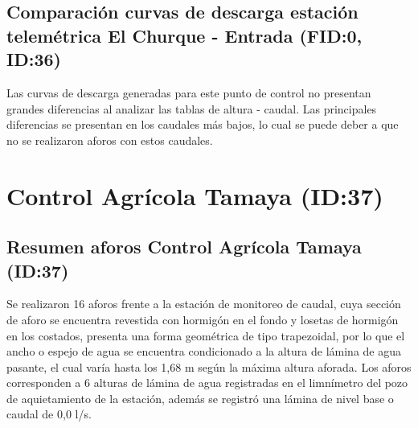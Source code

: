 \documentclass[]{article}
\begin{document}
\subsection{Comparación curvas de descarga estación telemétrica El Churque - Entrada (FID:0, ID:36)}\label{comparación curvas}

Las curvas de descarga generadas para este punto de control no presentan grandes diferencias al analizar las tablas de altura - caudal. Las principales diferencias se presentan en los caudales más bajos, lo cual se puede deber a que no se realizaron aforos con estos caudales.

\clearpage

\section{Control Agrícola Tamaya (ID:37)}\label{ID:37}

\subsection{Resumen aforos Control Agrícola Tamaya (ID:37)}\label{aforos ID:37}

Se realizaron 16 aforos frente a la estación de monitoreo de caudal, cuya sección de aforo se encuentra revestida con hormigón en el fondo y losetas de hormigón en los costados, presenta una forma geométrica de tipo trapezoidal, por lo que el ancho o espejo de agua se encuentra condicionado a la altura de lámina de agua pasante, el cual varía hasta los 1,68 m según la máxima altura aforada. Los aforos corresponden a 6 alturas de lámina de agua registradas en el limnímetro del pozo de aquietamiento de la estación, además se registró una lámina de nivel base o caudal de 0,0 l/s.
\end{document}
